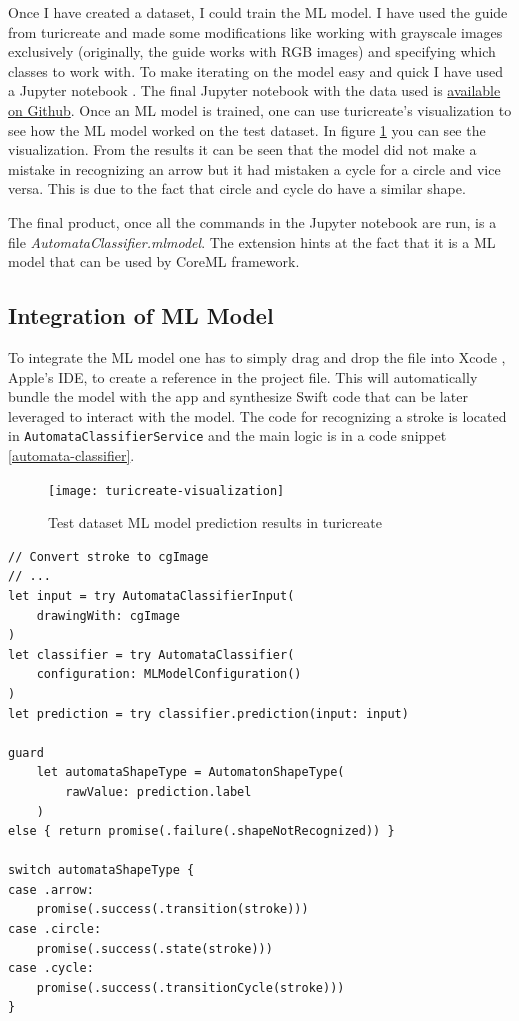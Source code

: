Once I have created a dataset, I could train the ML model. I have used the guide from turicreate and made some modifications like working with grayscale images exclusively (originally, the guide works with RGB images) and specifying which classes to work with. To make iterating on the model easy and quick I have used a Jupyter notebook \cite{jupyter}. The final Jupyter notebook with the data used is \href{https://github.com/fortmarek/automata-editor-model/}{available on Github}. Once an ML model is trained, one can use turicreate's visualization to see how the ML model worked on the test dataset. In figure \ref{turicreate-visualization} you can see the visualization. From the results it can be seen that the model did not make a mistake in recognizing an arrow but it had mistaken a cycle for a circle and vice versa. This is due to the fact that circle and cycle do have a similar shape.

The final product, once all the commands in the Jupyter notebook are run, is a file \textit{AutomataClassifier.mlmodel}. The extension hints at the fact that it is a ML model that can be used by CoreML framework.

\subsection{Integration of ML Model}

To integrate the ML model one has to simply drag and drop the file into Xcode \cite{xcode}, Apple's IDE, to create a reference in the project file. This will automatically bundle the model with the app and synthesize Swift code that can be later leveraged to interact with the model. The code for recognizing a stroke is located in \lstinline{AutomataClassifierService} and the main logic is in a code snippet \ref{automata-classifier}.

\begin{figure}
    \texttt{[image: turicreate-visualization]}
    \caption{Test dataset ML model prediction results in turicreate}\label{turicreate-visualization}
\end{figure}

\begin{lstlisting}[caption=Automata classifier, label=automata-classifier]
// Convert stroke to cgImage
// ...
let input = try AutomataClassifierInput(
    drawingWith: cgImage
)
let classifier = try AutomataClassifier(
    configuration: MLModelConfiguration()
)
let prediction = try classifier.prediction(input: input)

guard
    let automataShapeType = AutomatonShapeType(
        rawValue: prediction.label
    )
else { return promise(.failure(.shapeNotRecognized)) }

switch automataShapeType {
case .arrow:
    promise(.success(.transition(stroke)))
case .circle:
    promise(.success(.state(stroke)))
case .cycle:
    promise(.success(.transitionCycle(stroke)))
}
\end{lstlisting}

